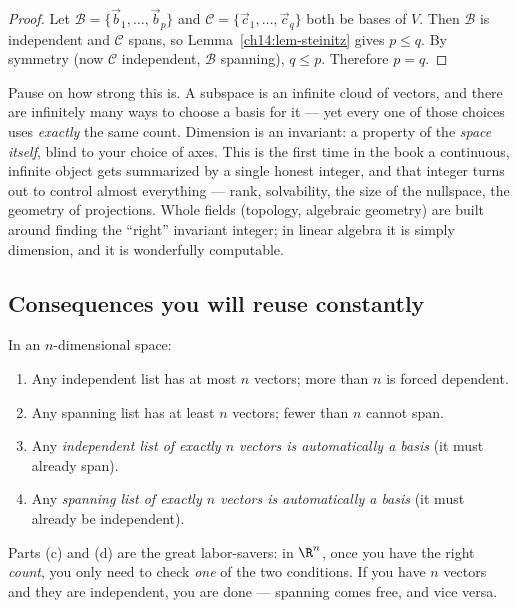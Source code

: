 \begin{proof}
Let $\mathcal B = \{\vec{b}_1,\dots,\vec{b}_p\}$ and $\mathcal C =
\{\vec{c}_1,\dots,\vec{c}_q\}$ both be bases of $V$. Then $\mathcal B$ is
independent and $\mathcal C$ spans, so Lemma~\ref{ch14:lem-steinitz} gives $p \le
q$. By symmetry (now $\mathcal C$ independent, $\mathcal B$ spanning), $q \le p$.
Therefore $p = q$.
\end{proof}

\begin{aestheticbox}
Pause on how strong this is. A subspace is an infinite cloud of vectors, and
there are infinitely many ways to choose a basis for it --- yet every one of
those choices uses \emph{exactly} the same count. Dimension is an invariant: a
property of the \emph{space itself}, blind to your choice of axes. This is the
first time in the book a continuous, infinite object gets summarized by a single
honest integer, and that integer turns out to control almost everything --- rank,
solvability, the size of the nullspace, the geometry of projections. Whole fields
(topology, algebraic geometry) are built around finding the ``right'' invariant
integer; in linear algebra it is simply dimension, and it is wonderfully
computable.
\end{aestheticbox}

\subsection*{Consequences you will reuse constantly}

\begin{corollary}
\label{ch14:cor-count}
In an $n$-dimensional space:
\begin{enumerate}[label=(\alph*)]
  \item Any independent list has at most $n$ vectors; more than $n$ is forced
        dependent.
  \item Any spanning list has at least $n$ vectors; fewer than $n$ cannot span.
  \item Any \emph{independent list of exactly $n$ vectors is automatically a
        basis} (it must already span).
  \item Any \emph{spanning list of exactly $n$ vectors is automatically a basis}
        (it must already be independent).
\end{enumerate}
\end{corollary}

Parts (c) and (d) are the great labor-savers: in $\R^n$, once you have the right
\emph{count}, you only need to check \emph{one} of the two conditions. If you have
$n$ vectors and they are independent, you are done --- spanning comes free, and
vice versa.


